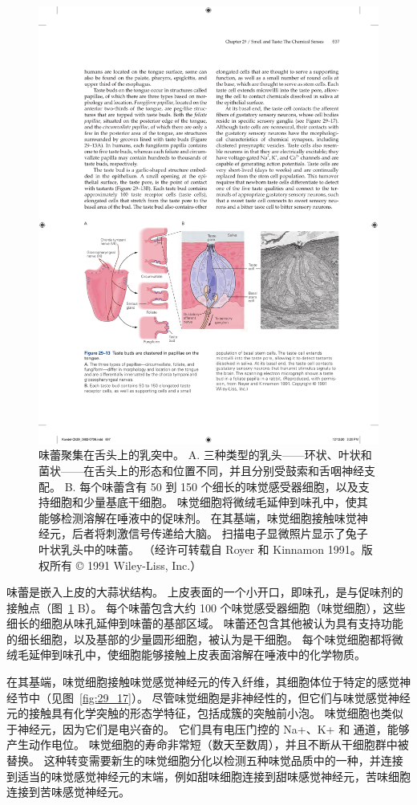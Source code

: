 \begin{figure}[htbp]
	\centering
	\includegraphics[width=0.95\linewidth]{chap29/fig_29_13}
	\caption{味蕾聚集在舌头上的乳突中。 A. 三种类型的乳头——环状、叶状和菌状——在舌头上的形态和位置不同，并且分别受鼓索和舌咽神经支配。 B. 每个味蕾含有 50 到 150 个细长的味觉感受器细胞，以及支持细胞和少量基底干细胞。 味觉细胞将微绒毛延伸到味孔中，使其能够检测溶解在唾液中的促味剂。 在其基端，味觉细胞接触味觉神经元，后者将刺激信号传递给大脑。 扫描电子显微照片显示了兔子叶状乳头中的味蕾。 （经许可转载自 Royer 和 Kinnamon 1991。版权所有 © 1991 Wiley-Liss, Inc.）}
	\label{fig:29_13}
\end{figure}


味蕾是嵌入上皮的大蒜状结构。
上皮表面的一个小开口，即味孔，是与促味剂的接触点（图~\ref{fig:29_13} B）。
每个味蕾包含大约 100 个味觉感受器细胞（味觉细胞），这些细长的细胞从味孔延伸到味蕾的基部区域。
味蕾还包含其他被认为具有支持功能的细长细胞，以及基部的少量圆形细胞，被认为是干细胞。
每个味觉细胞都将微绒毛延伸到味孔中，使细胞能够接触上皮表面溶解在唾液中的化学物质。


在其基端，味觉细胞接触味觉感觉神经元的传入纤维，其细胞体位于特定的感觉神经节中（见图~\ref{fig:29_17}）。
尽管味觉细胞是非神经性的，但它们与味觉感觉神经元的接触具有化学突触的形态学特征，包括成簇的突触前小泡。
味觉细胞也类似于神经元，因为它们是电兴奋的。 它们具有电压门控的 Na+、K+ 和  通道，能够产生动作电位。
味觉细胞的寿命非常短（数天至数周），并且不断从干细胞群中被替换。
这种转变需要新生的味觉细胞分化以检测五种味觉品质中的一种，并连接到适当的味觉感觉神经元的末端，例如甜味细胞连接到甜味感觉神经元，苦味细胞连接到苦味感觉神经元。


